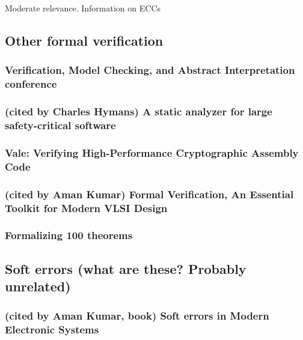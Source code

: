 \documentclass{article}
\begin{document}
Moderate relevance. Information on ECCs


\subsection{Other formal verification}

\subsubsection{Verification, Model Checking, and Abstract Interpretation conference}

\subsubsection{(cited by Charles Hymans) A static analyzer for large safety-critical software}


\subsubsection{Vale: Verifying {High-Performance} Cryptographic Assembly Code}

\subsubsection{(cited by Aman Kumar) Formal Verification, An Essential Toolkit for Modern VLSI Design} 

\subsubsection{Formalizing 100 theorems}


\subsection{Soft errors (what are these? Probably unrelated)}

\subsubsection{(cited by Aman Kumar, book) Soft errors in Modern Electronic Systems}
\end{document}
